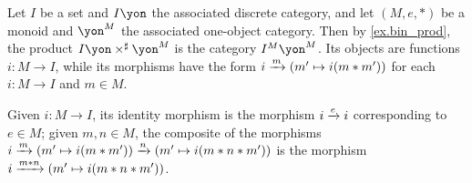 \documentclass[Book-Poly]{subfiles}
\begin{document}
\begin{example}
Let $I$ be a set and $I\yon$ the associated discrete category, and let $(M,e,*)$ be a monoid and $\yon^M$ the associated one-object category.
Then by \cref{ex.bin_prod}, the product $I\yon \times^\sharp \yon^M$ is the category $I^M\yon^M$.
Its objects are functions $i \colon M \to I$, while its morphisms have the form $i \xrightarrow{m} (m' \mapsto i(m * m'))$ for each $i \colon M \to I$ and $m \in M$.

Given $i \colon M \to I$, its identity morphism is the morphism $i \xrightarrow{e} i$ corresponding to $e \in M$; given $m, n \in M$, the composite of the morphisms $i \xrightarrow{m} (m' \mapsto i(m * m')) \xrightarrow{n} (m' \mapsto i(m * n * m'))$ is the morphism $i \xrightarrow{m * n} (m' \mapsto i(m * n * m'))$.

\end{example}


\end{document}
